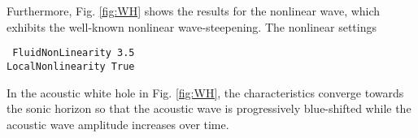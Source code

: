 Furthermore, Fig. \ref{fig:WH} shows the results for the nonlinear wave, which exhibits the well-known nonlinear wave-steepening. The nonlinear settings

    {\tt
        FluidNonLinearity 3.5 \\
        LocalNonlinearity True
    }

In the acoustic white hole in Fig. \ref{fig:WH}, the characteristics converge towards the sonic horizon so that the acoustic wave is progressively blue-shifted while the acoustic wave amplitude increases over time.

\begin{figure*}
    \caption{Example of an acoustic white hole.}
    \label{fig:BH}
\end{figure*}


\begin{figure*}
    \caption{Example of an acoustic white hole.}
    \label{fig:WH}
\end{figure*}



